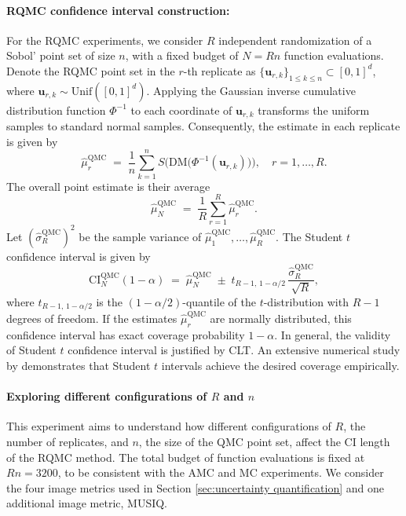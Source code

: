 \documentclass[12pt]{article}
\newcommand{\0}{\mathbf{0}}
\newcommand{\DM}{\text{DM}}
\newcommand{\CI}{\text{CI}}
\newcommand{\QMC}{\text{QMC}}
\begin{document}
\paragraph{RQMC confidence interval construction:} For the RQMC experiments, we consider $R$ independent randomization of a Sobol' point set of size $n$, with a fixed budget of $N=Rn$ function evaluations. Denote the RQMC point set in the $r$-th replicate as $\{\mathbf{u}_{r,k} \}_{1\leq k\leq n}\subset [0,1]^d $, where $\mathbf{u}_{r,k}\sim \mathrm{Unif}([0,1]^d)$. Applying the Gaussian inverse cumulative distribution function $\Phi^{-1}$ to each coordinate of $\mathbf u_{r,k}$ transforms the uniform samples to standard normal samples. Consequently, the estimate in each replicate is given by
$$
\hat\mu_r^{\QMC}\;=\;\frac1{n}\sum_{k=1}^{n}
S\bigl(\DM\bigl(\Phi^{-1}(\mathbf u_{r,k})\bigr)\bigr),
\quad r=1,\dots,R.
$$
The overall point estimate is their average
$$
\hat\mu_{N}^{\QMC}\;=\;\frac1{R}\sum_{r=1}^{R}\hat\mu_r^{\QMC}.
$$
Let $(\hat\sigma_{R}^{\QMC})^{2}$ be the sample variance of $\hat\mu_1^{\QMC}, \ldots, \hat\mu_R^{\QMC}$. The Student $t$ confidence interval is given by
$$
\CI_{N}^{\QMC}(1-\alpha)\;=\;
\hat\mu_{N}^{\QMC}\;
\pm\;
t_{R-1,\,1-\alpha/2}\,
\frac{\hat\sigma_{R}^{\QMC}}{\sqrt{R}},
$$
where $t_{R-1,\,1-\alpha/2}$ is the $(1-\alpha/2)$-quantile of the $t$-distribution with $R-1$ degrees of freedom. If the estimates $\hat\mu_r^{\QMC}$ are normally distributed, this confidence interval has exact coverage probability $1-\alpha$. In general, the validity of Student $t$ confidence interval is justified by CLT. An extensive numerical study by \citet{lecuyer2023confidence} demonstrates that Student $t$ intervals achieve the desired coverage empirically.

\paragraph{Exploring different configurations of $R$ and $n$}

This experiment aims to understand how different configurations of $R$, the number of replicates, and $n$, the size of the QMC point set, affect the CI length of the RQMC method. The total budget of function evaluations is fixed at $Rn=3200$, to be consistent with the AMC and MC experiments. We consider the four image metrics used in Section \ref{sec:uncertainty quantification} and one additional image metric, MUSIQ. 
\end{document}
